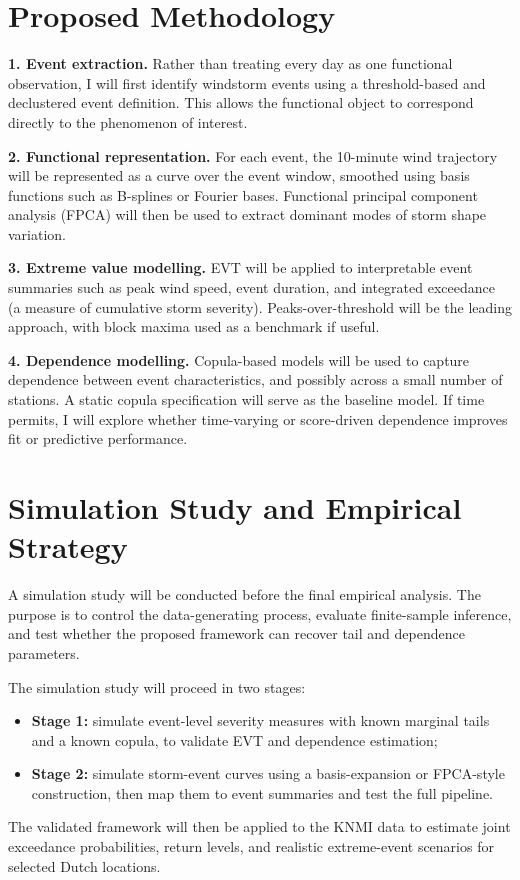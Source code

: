 
\section*{Proposed Methodology}
\textbf{1. Event extraction.} Rather than treating every day as one functional observation, I will first identify windstorm events using a threshold-based and declustered event definition. This allows the functional object to correspond directly to the phenomenon of interest.

\textbf{2. Functional representation.} For each event, the 10-minute wind trajectory will be represented as a curve over the event window, smoothed using basis functions such as B-splines or Fourier bases. Functional principal component analysis (FPCA) will then be used to extract dominant modes of storm shape variation.

\textbf{3. Extreme value modelling.} EVT will be applied to interpretable event summaries such as peak wind speed, event duration, and integrated exceedance (a measure of cumulative storm severity). Peaks-over-threshold will be the leading approach, with block maxima used as a benchmark if useful.

\textbf{4. Dependence modelling.} Copula-based models will be used to capture dependence between event characteristics, and possibly across a small number of stations. A static copula specification will serve as the baseline model. If time permits, I will explore whether time-varying or score-driven dependence improves fit or predictive performance.

\section*{Simulation Study and Empirical Strategy}
A simulation study will be conducted before the final empirical analysis. The purpose is to control the data-generating process, evaluate finite-sample inference, and test whether the proposed framework can recover tail and dependence parameters.

The simulation study will proceed in two stages:
\begin{itemize}
    \item \textbf{Stage 1:} simulate event-level severity measures with known marginal tails and a known copula, to validate EVT and dependence estimation;
    \item \textbf{Stage 2:} simulate storm-event curves using a basis-expansion or FPCA-style construction, then map them to event summaries and test the full pipeline.
\end{itemize}

The validated framework will then be applied to the KNMI data to estimate joint exceedance probabilities, return levels, and realistic extreme-event scenarios for selected Dutch locations.

